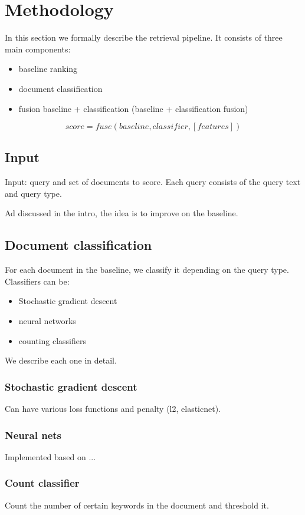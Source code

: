 \chapter{Methodology}


In this section we formally describe the retrieval pipeline. It consists of three main components:
\begin{itemize}
 \item baseline ranking
 \item document classification
 \item fusion baseline + classification (baseline + classification fusion)
\end{itemize}
\[score = fuse(baseline, classifier, [features])\]
\section{Input}
Input: query and set of documents to score. Each query consists of the query text and query type.

Ad discussed in the intro, the idea is to improve on the baseline.

\section{Document classification}
For each document in the baseline, we classify it depending on the query type.
Classifiers can be:
\begin{itemize}
 \item Stochastic gradient descent
 \item neural networks
 \item counting classifiers
\end{itemize}

We describe each one in detail.
\subsection{Stochastic gradient descent}
Can have various loss functions and penalty (l2, elasticnet).

\subsection{Neural nets}
Implemented based on ...

\subsection{Count classifier}
Count the number of certain keywords in the document and threshold it.

